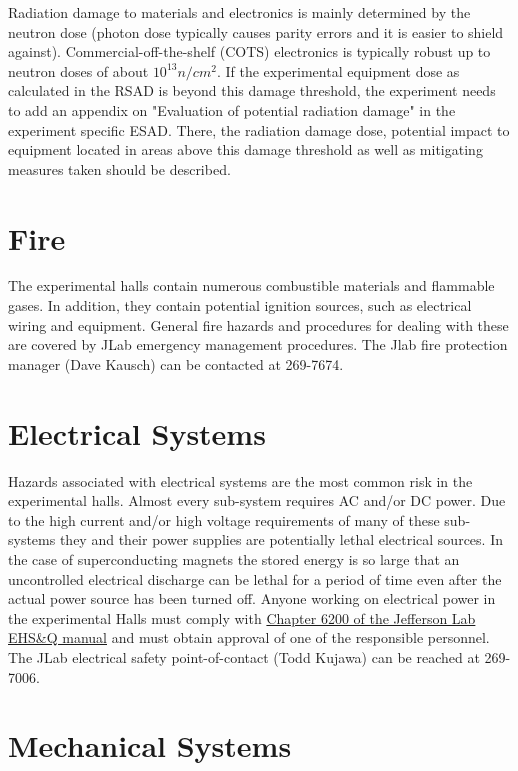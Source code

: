 Radiation damage to materials and electronics is mainly determined by the neutron 
dose (photon dose typically causes parity errors and it is easier to shield against). 
Commercial-off-the-shelf (COTS) electronics is typically robust up to neutron 
doses of about $10^{13} n/cm^2$. If the experimental equipment dose as calculated 
in the RSAD is beyond this damage threshold, the experiment needs to add 
an appendix on "Evaluation of potential radiation damage" in the experiment 
specific ESAD. There, the radiation damage dose, potential impact to equipment 
located in areas above this damage threshold as well as mitigating measures taken should be described.

\section{Fire}

	The experimental halls contain numerous combustible materials and flammable gases. 
In addition, they contain potential ignition sources, such as electrical wiring and equipment. 
General fire hazards and procedures for dealing with these are covered by JLab emergency 
management procedures. The Jlab fire protection manager (Dave Kausch) can be contacted at 269-7674.

\section{Electrical Systems}

	Hazards associated with electrical systems are the most common risk in the experimental halls. 
Almost every sub-system requires AC and/or DC power. Due to the high current and/or high voltage 
requirements of many of these sub-systems they and their power supplies are potentially lethal 
electrical sources. In the case of superconducting magnets the stored energy is so large that 
an uncontrolled electrical discharge can be lethal for a period of time even after the actual 
power source has been turned off.  Anyone working on electrical power in the experimental Halls 
must comply with \href{http://www.jlab.org/ehs/ehsmanual/manual/6200.html}{Chapter 6200 of the Jefferson Lab EHS\&Q manual}
and must obtain approval of one of the responsible personnel. 
The JLab electrical safety point-of-contact (Todd Kujawa) can be reached at 269-7006.

\section{Mechanical Systems}

